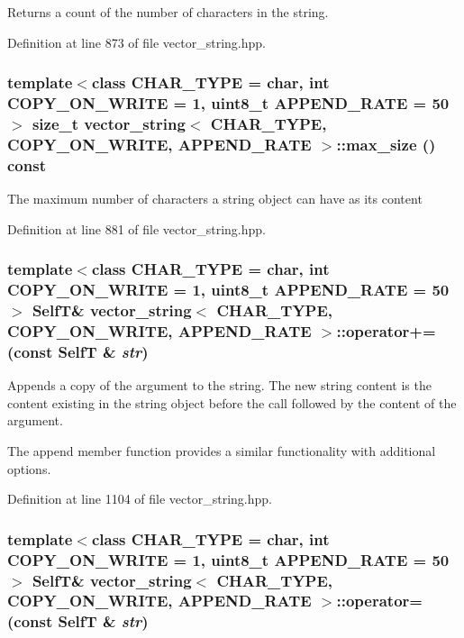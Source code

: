 Returns a count of the number of characters in the string. 

Definition at line 873 of file vector\_\-string.hpp.\hypertarget{classvector__string_d971eef9c6f24f1292a3a52d7b66d43f}{
\subsubsection[{max\_\-size}]{\setlength{\rightskip}{0pt plus 5cm}template$<$class CHAR\_\-TYPE  = char, int COPY\_\-ON\_\-WRITE = 1, uint8\_\-t APPEND\_\-RATE = 50$>$ size\_\-t {\bf vector\_\-string}$<$ CHAR\_\-TYPE, COPY\_\-ON\_\-WRITE, APPEND\_\-RATE $>$::max\_\-size () const}}
\label{classvector__string_d971eef9c6f24f1292a3a52d7b66d43f}


The maximum number of characters a string object can have as its content 

Definition at line 881 of file vector\_\-string.hpp.\hypertarget{classvector__string_1ec6b1fc1e84f88d93a40084e4e01cef}{
\subsubsection[{operator+=}]{\setlength{\rightskip}{0pt plus 5cm}template$<$class CHAR\_\-TYPE  = char, int COPY\_\-ON\_\-WRITE = 1, uint8\_\-t APPEND\_\-RATE = 50$>$ {\bf SelfT}\& {\bf vector\_\-string}$<$ CHAR\_\-TYPE, COPY\_\-ON\_\-WRITE, APPEND\_\-RATE $>$::operator+= (const {\bf SelfT} \& {\em str})}}
\label{classvector__string_1ec6b1fc1e84f88d93a40084e4e01cef}


Appends a copy of the argument to the string. The new string content is the content existing in the string object before the call followed by the content of the argument.

The append member function provides a similar functionality with additional options. 

Definition at line 1104 of file vector\_\-string.hpp.\hypertarget{classvector__string_c7b73207a93f6131906e6938819fcfa4}{
\subsubsection[{operator=}]{\setlength{\rightskip}{0pt plus 5cm}template$<$class CHAR\_\-TYPE  = char, int COPY\_\-ON\_\-WRITE = 1, uint8\_\-t APPEND\_\-RATE = 50$>$ {\bf SelfT}\& {\bf vector\_\-string}$<$ CHAR\_\-TYPE, COPY\_\-ON\_\-WRITE, APPEND\_\-RATE $>$::operator= (const {\bf SelfT} \& {\em str})}}
\label{classvector__string_c7b73207a93f6131906e6938819fcfa4}


